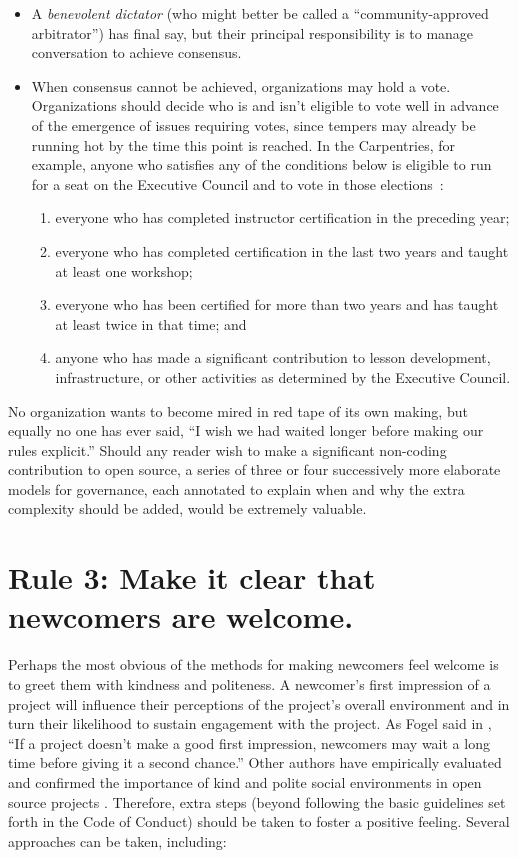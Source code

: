 \documentclass[10pt,letterpaper]{article}
\newcommand{\rulemajor}[1]{\section*{#1}}
\begin{document}
\begin{itemize}
	
	\item
	A \emph{benevolent dictator} (who might better be called a ``community-approved arbitrator'') has final say,
	but their principal responsibility is to manage conversation to achieve consensus.
	
	\item
	When consensus cannot be achieved,
	organizations may hold a vote.
	Organizations should decide who is and isn't eligible to vote well in advance of the emergence of issues requiring votes,
	since tempers may already be running hot by the time this point is reached.
	In the Carpentries,
	for example,
	anyone who satisfies any of the conditions below is eligible to run for a seat on the Executive Council
	and to vote in those elections~\cite{carpentries-bylaws}:
	\begin{enumerate}
		\item everyone who has completed instructor certification in the preceding year;
		\item everyone who has completed certification in the last two years and taught at least one workshop;
		\item everyone who has been certified for more than two years and has taught at least twice in that time; and
		\item anyone who has made a significant contribution to lesson development, infrastructure, or other activities as determined by the Executive Council.
	\end{enumerate}
	
\end{itemize}

No organization wants to become mired in red tape of its own making,
but equally no one has ever said,
``I wish we had waited longer before making our rules explicit.''
Should any reader wish to make a significant non-coding contribution to open source,
a series of three or four successively more elaborate models for governance,
each annotated to explain when and why the extra complexity should be added, would be extremely valuable.

\rulemajor{Rule 3: Make it clear that newcomers are welcome.}

Perhaps the most obvious of the methods for making newcomers feel welcome is to greet them with kindness and politeness.
A newcomer's first impression of a project will influence their perceptions of the project's overall environment
and in turn their likelihood to sustain engagement with the project.
As Fogel said in \cite{fogel2005},
``If a project doesn't make a good first impression, newcomers may wait a long time before giving it a second chance.''
Other authors have empirically evaluated and confirmed the importance of kind and polite social environments
in open source projects \cite{singh2012,steinmacher2013,steinmacher2018}.
Therefore,
extra steps
(beyond following the basic guidelines set forth in the Code of Conduct)
should be taken to foster a positive feeling.
Several approaches can be taken, including:
\end{document}
